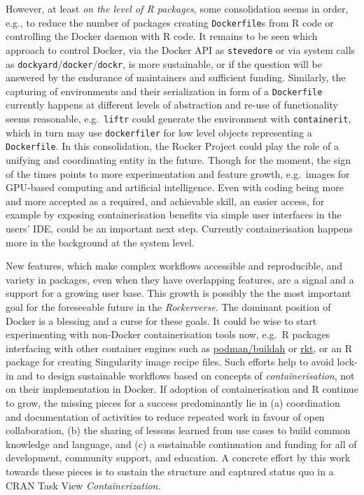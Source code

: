 However, at least \emph{on the level of R packages}, some consolidation
seems in order, e.g., to reduce the number of packages creating
\texttt{Dockerfile}s from R code or controlling the Docker daemon with R
code. It remains to be seen which approach to control Docker, via the
Docker API as \texttt{stevedore} or via system calls as
\texttt{dockyard}/\texttt{docker}/\texttt{dockr}, is more sustainable,
or if the question will be answered by the endurance of maintainers and
sufficient funding. Similarly, the capturing of environments and their
serialization in form of a \texttt{Dockerfile} currently happens at
different levels of abstraction and re-use of functionality seems
reasonable, e.g.~\texttt{liftr} could generate the environment with
\texttt{containerit}, which in turn may use \texttt{dockerfiler} for low
level objects representing a \texttt{Dockerfile}. In this consolidation,
the Rocker Project could play the role of a unifying and coordinating
entity in the future. Though for the moment, the sign of the times
points to more experimentation and feature growth, e.g.~images for
GPU-based computing and artificial intelligence. Even with coding being
more and more accepted as a required, and achievable skill, an easier
access, for example by exposing containerisation benefits via simple
user interfaces in the users' IDE, could be an important next step.
Currently containerisation happens more in the background at the system
level.

New features, which make complex workflows accessible and reproducible,
and variety in packages, even when they have overlapping features, are a
signal and a support for a growing user base. This growth is possibly
the the most important goal for the foreseeable future in the
\emph{Rockerverse}. The dominant position of Docker is a blessing and a
curse for these goals. It could be wise to start experimenting with
non-Docker containerisation tools now, e.g.~R packages interfacing with
other container engines such as
\href{https://github.com/containers/libpod}{podman/buildah} or
\href{https://coreos.com/rkt/}{rkt}, or an R package for creating
Singularity image recipe files. Such efforts help to avoid lock-in and
to design sustainable workflows based on concepts of
\emph{containerisation}, not on their implementation in Docker. If
adoption of containerisation and R continue to grow, the missing pieces
for a success predominantly lie in (a) coordination and documentation of
activities to reduce repeated work in favour of open collaboration, (b)
the sharing of lessons learned from use cases to build common knowledge
and language, and (c) a sustainable continuation and funding for all of
development, community support, and education. A concrete effort by this
work towards these pieces is to sustain the structure and captured
status quo in a CRAN Task View \emph{Containerization}.

